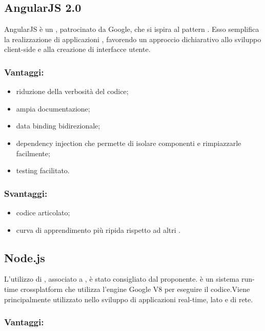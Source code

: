 \documentclass[a4paper, titlepage]{article}
\begin{document}
\subsection{AngularJS 2.0}
AngularJS è un   , patrocinato da Google, che si ispira al pattern .
Esso semplifica la realizzazione di applicazioni , favorendo un approccio dichiarativo allo sviluppo client-side e alla creazione di interfacce utente.

\subsubsection{Vantaggi:}

\begin{itemize}
	\item riduzione della verbosità del codice;
	\item ampia documentazione;
	\item data binding bidirezionale;
	\item dependency injection che permette di isolare componenti e rimpiazzarle facilmente;
	\item testing facilitato.
\end{itemize}

\subsubsection{Svantaggi:}

\begin{itemize}
	\item codice articolato;
	\item curva di apprendimento più ripida rispetto ad altri .
\end{itemize}

\subsection{Node.js}
L'utilizzo di , associato a , è stato consigliato dal proponente.  è un sistema run-time crossplatform che utilizza l’engine Google V8  per eseguire il codice.\newline Viene principalmente utilizzato nello sviluppo di applicazioni real-time, lato  e di rete.

\subsubsection{Vantaggi:}
\end{document}
